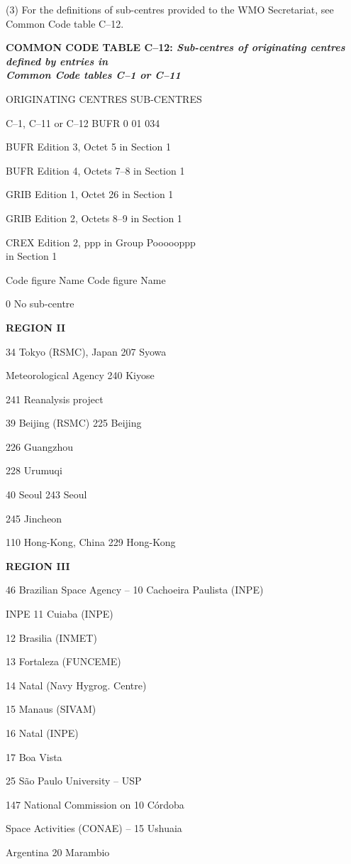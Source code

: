 (3) For the definitions of sub-centres provided to the WMO Secretariat, see Common Code table C--12.

\textbf{COMMON CODE TABLE C--12: \emph{Sub-centres of originating centres defined by entries in\\
Common Code tables C--1 or C--11}}

ORIGINATING CENTRES SUB-CENTRES

C--1, C--11 or C--12 BUFR 0 01 034

BUFR Edition 3, Octet 5 in Section 1

BUFR Edition 4, Octets 7--8 in Section 1

GRIB Edition 1, Octet 26 in Section 1

GRIB Edition 2, Octets 8--9 in Section 1

CREX Edition 2, ppp in Group Poooooppp\\
in Section 1

Code figure Name Code figure Name

0 No sub-centre

\textbf{REGION II}

34 Tokyo (RSMC), Japan 207 Syowa

Meteorological Agency 240 Kiyose

241 Reanalysis project

39 Beijing (RSMC) 225 Beijing

226 Guangzhou

228 Urumuqi

40 Seoul 243 Seoul

245 Jincheon

110 Hong-Kong, China 229 Hong-Kong

\textbf{REGION III}

46 Brazilian Space Agency -- 10 Cachoeira Paulista (INPE)

INPE 11 Cuiaba (INPE)

12 Brasilia (INMET)

13 Fortaleza (FUNCEME)

14 Natal (Navy Hygrog. Centre)

15 Manaus (SIVAM)

16 Natal (INPE)

17 Boa Vista

25 São Paulo University -- USP

147 National Commission on 10 Córdoba

Space Activities (CONAE) -- 15 Ushuaia

Argentina 20 Marambio

